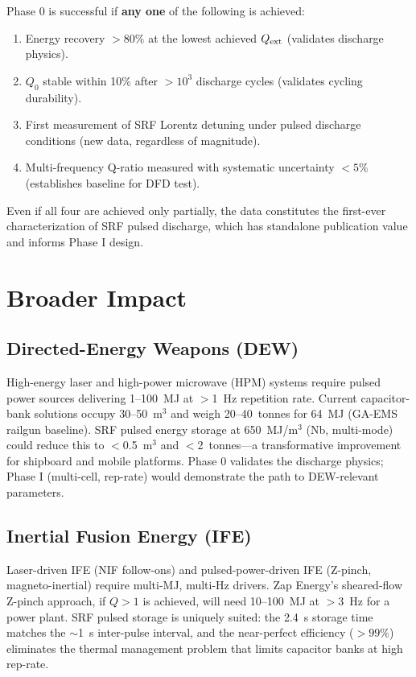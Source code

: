 \documentclass[11pt]{article}
\newcommand{\Qext}{Q_{\rm ext}}
\newcommand{\Qzero}{Q_0}
\begin{document}
Phase 0 is successful if \textbf{any one} of the following is achieved:
\begin{enumerate}[nosep]
  \item Energy recovery $> 80\%$ at the lowest achieved $\Qext$
    (validates discharge physics).
  \item $\Qzero$ stable within 10\% after $> 10^3$ discharge cycles
    (validates cycling durability).
  \item First measurement of SRF Lorentz detuning under pulsed
    discharge conditions (new data, regardless of magnitude).
  \item Multi-frequency Q-ratio measured with systematic uncertainty
    $< 5\%$ (establishes baseline for DFD test).
\end{enumerate}

Even if all four are achieved only partially, the data constitutes
the first-ever characterization of SRF pulsed discharge, which has
standalone publication value and informs Phase I design.

\section{Broader Impact}
\label{sec:impact}

\subsection{Directed-Energy Weapons (DEW)}

High-energy laser and high-power microwave (HPM) systems require
pulsed power sources delivering 1--100~MJ at $>$1~Hz repetition rate.
Current capacitor-bank solutions occupy 30--50~m$^3$ and weigh
20--40~tonnes for 64~MJ (GA-EMS railgun baseline). SRF pulsed
energy storage at 650~MJ/m$^3$ (Nb, multi-mode) could reduce this
to $<$0.5~m$^3$ and $<$2~tonnes---a transformative improvement for
shipboard and mobile platforms. Phase 0 validates the discharge
physics; Phase I (multi-cell, rep-rate) would demonstrate the path
to DEW-relevant parameters.

\subsection{Inertial Fusion Energy (IFE)}

Laser-driven IFE (NIF follow-ons) and pulsed-power-driven IFE
(Z-pinch, magneto-inertial) require multi-MJ, multi-Hz drivers.
Zap Energy's sheared-flow Z-pinch approach, if $Q > 1$ is achieved,
will need 10--100~MJ at $>$3~Hz for a power plant. SRF pulsed
storage is uniquely suited: the 2.4~s storage time matches the
$\sim$1~s inter-pulse interval, and the near-perfect efficiency
($>99\%$) eliminates the thermal management problem that limits
capacitor banks at high rep-rate.
\end{document}
